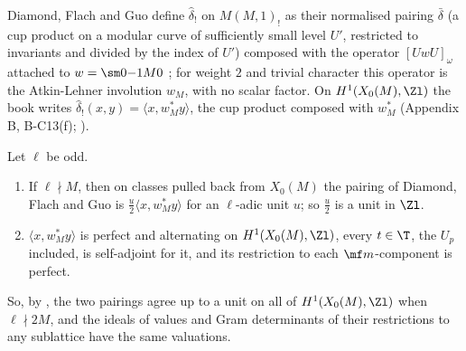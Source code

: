 \begin{definition}\label{def:congruence:dfg-pairing}
Diamond, Flach and Guo define $\hat\delta_!$ on $M(M,1)_!$ as their normalised pairing $\bar\delta$ (a cup product on a modular curve of sufficiently small level $U'$, restricted to invariants and
divided by the index of $U'$) composed with the operator $[UwU]_\omega$ attached to $w=\sm0{-1}M0$ \cite[Sections 1.5.2, 1.5.3, (13), (14)]{DFG04}; for weight $2$ and trivial character this operator is the Atkin-Lehner
involution $w_M$, with no scalar factor. On $H^1(X_0(M),\Zl)$ the book writes $\hat\delta_!(x,y)=\langle x,w_M^*y\rangle$, the cup product composed with $w_M^*$ (Appendix B, B-C13(f);
).
\end{definition}

\begin{proposition}\label{prop:congruence:dfg-pairing}
Let $\ell$ be odd.
\begin{enumerate}[label=(\roman*)]
\item If $\ell\nmid M$, then on classes pulled back from $X_0(M)$ the pairing of Diamond, Flach and Guo is $\frac u2\langle x,w_M^*y\rangle$ for an $\ell$-adic unit $u$; so $\frac u2$ is a unit in $\Zl$.
\item $\langle x,w_M^*y\rangle$ is perfect and alternating on $H^1(X_0(M),\Zl)$, every $t\in\T$, the $U_p$ included, is self-adjoint for it, and its restriction to each $\mf m$-component is perfect.
\end{enumerate}
So, by , the two pairings agree up to a unit on all of $H^1(X_0(M),\Zl)$ when $\ell\nmid2M$, and the ideals of values and Gram determinants of their restrictions to any sublattice have the same
valuations.
\end{proposition}

